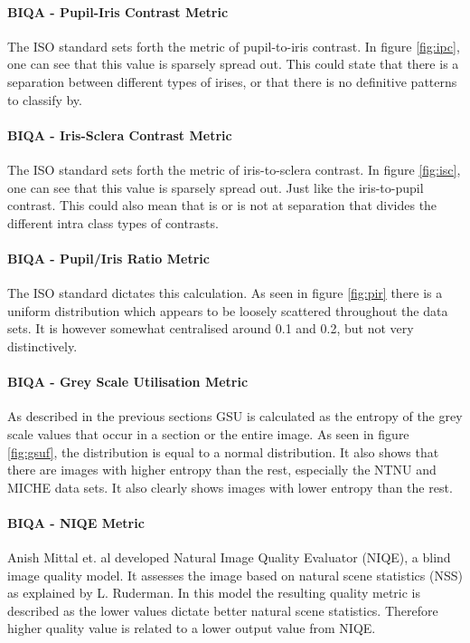 \paragraph{BIQA - Pupil-Iris Contrast Metric}
The ISO standard sets forth the metric of pupil-to-iris contrast. In figure
\ref{fig:ipc}, one can see that this value is sparsely spread out. This could
state that there is a separation between different types of irises, or that
there is no definitive patterns to classify by.


\paragraph{BIQA - Iris-Sclera Contrast Metric}
The ISO standard sets forth the metric of iris-to-sclera contrast. In figure
\ref{fig:isc}, one can see that this value is sparsely spread out. Just like the
iris-to-pupil contrast.  This could also  mean that is or is not at separation
that divides the different intra class types of contrasts.


\paragraph{BIQA - Pupil/Iris Ratio Metric}
The ISO standard dictates this calculation.  As seen in figure \ref{fig:pir} 
there is a uniform distribution which appears to be loosely scattered throughout
the data sets.  It is however somewhat centralised around 0.1 and 0.2, but not
very distinctively.


\paragraph{BIQA - Grey Scale Utilisation Metric}
As described in the previous sections GSU is calculated as the entropy of the
grey scale values that occur in a section or the entire image.  As seen in figure
\ref{fig:gsuf}, the distribution is equal to a normal distribution.  It also
shows that there are images with higher entropy than the rest, especially the
NTNU and MICHE data sets.  It also clearly shows images with lower entropy than
the rest.


\paragraph{BIQA - NIQE Metric}
Anish Mittal et. al developed Natural Image Quality Evaluator (NIQE), a blind 
image quality model\cite{niqe}.  It assesses the image based on natural scene
statistics (NSS) as explained by L. Ruderman\cite{nss}.
In this model the resulting quality metric is described as the lower values
dictate better natural scene statistics. Therefore higher quality value is
related to a lower output value from NIQE.

